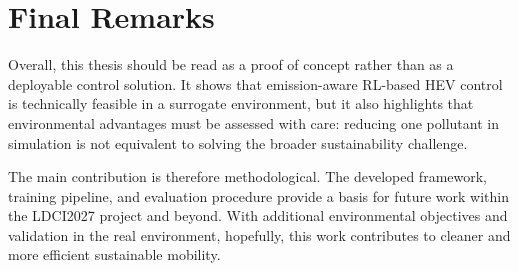\section{Final Remarks}
Overall, this thesis should be read as a proof of concept rather than as a deployable control solution. It shows that emission-aware \ac{RL}-based \ac{HEV} control is technically feasible in a surrogate environment, but it also highlights that environmental advantages must be assessed with care: reducing one pollutant in simulation is not equivalent to solving the broader sustainability challenge.

The main contribution is therefore methodological. The developed framework, training pipeline, and evaluation procedure provide a basis for future work within the \ac{LDCI2027} project and beyond. With additional environmental objectives and validation in the real environment, hopefully, this work contributes to cleaner and more efficient sustainable mobility.
